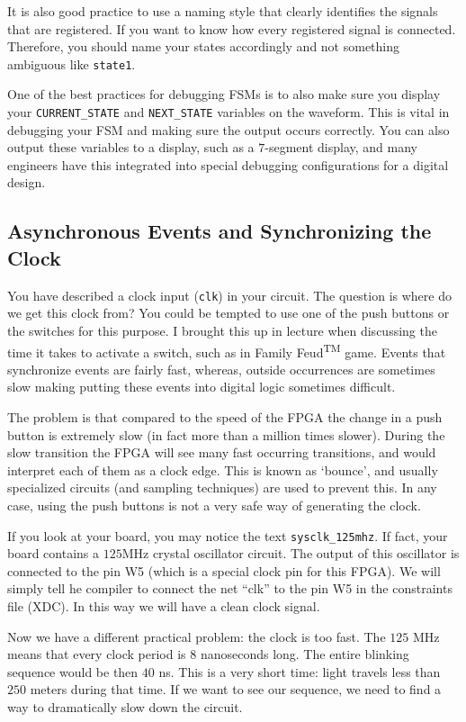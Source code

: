 \documentclass{article}
\begin{document}
It is also good practice to use a naming style that clearly identifies
the signals that are registered. If you want to know how every
registered signal is connected.  Therefore, you should name your
states accordingly and not something ambiguous like \verb!state1!.

One of the best practices for debugging FSMs is to also make sure you
display your \verb!CURRENT_STATE! and \verb!NEXT_STATE! variables on
the waveform.  This is vital in debugging your FSM and making sure the
output occurs correctly.  You can also output these variables to a
display, such as a $7$-segment display, and many engineers have this
integrated into special debugging configurations for a digital
design.

\subsection{Asynchronous Events and Synchronizing the Clock}

You have described a clock input (\verb!clk!) in your circuit. The question
is where do we get this clock from? You could be tempted to use one of
the push buttons or the switches for this purpose.  I brought this up
in lecture when discussing the time it takes to activate a switch,
such as in Family Feud\textsuperscript{TM} game.  Events that synchronize
events are fairly fast, whereas, outside occurrences are sometimes
slow making putting these events into digital logic sometimes
difficult.

The problem is that compared to the speed of the FPGA the change in a
push button is extremely slow (in fact more than a million times
slower). During the slow transition the FPGA will see many fast
occurring transitions, and would interpret each of them as a clock
edge. This is known as ‘bounce’, and usually specialized circuits (and
sampling techniques) are used to prevent this. In any case, using the
push buttons is not a very safe way of generating the clock.

If you look at your board, you may notice the text
\verb!sysclk_125mhz!. If fact, your board contains a $125$MHz crystal
oscillator circuit. The output of this oscillator is connected to the pin W5
(which is a special clock pin for this FPGA). We will simply tell
he compiler to connect the net “clk” to the pin W5 in the constraints
file (XDC). In this way we will have a clean clock signal.

Now we have a different practical problem: the clock is too fast. The $125$
MHz means that every clock period is $8$ nanoseconds long. The entire
blinking sequence would be then $40$ ns. This is a very short time:
light travels less than $250$ meters during that time. If we want to see
our sequence, we need to find a way to dramatically slow down the
circuit.
\end{document}
